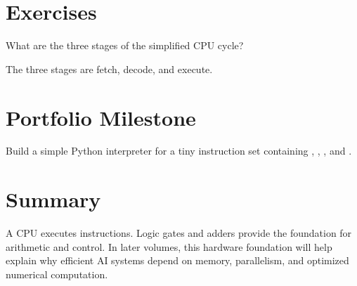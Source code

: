 \section{Exercises}

\begin{exercise}
What are the three stages of the simplified CPU cycle?
\end{exercise}

\begin{solution}
The three stages are fetch, decode, and execute.
\end{solution}

\section{Portfolio Milestone}

Build a simple Python interpreter for a tiny instruction set containing , , , and .

\section{Summary}

A CPU executes instructions. Logic gates and adders provide the foundation for arithmetic and control. In later volumes, this hardware foundation will help explain why efficient AI systems depend on memory, parallelism, and optimized numerical computation.
